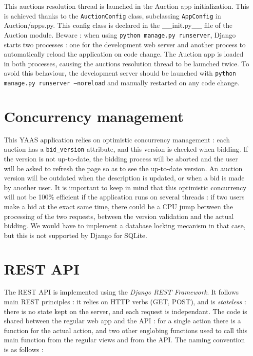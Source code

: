 \documentclass[a4paper, 11pt]{report}
\begin{document}
    This auctions resolution thread is launched in the Auction app initialization. This is achieved thanks to the \texttt{AuctionConfig} class, subclassing \texttt{AppConfig} in Auction/apps.py. This config class is declared in the \_\_init.py\_\_ file of the Auction module. Beware : when using \texttt{python manage.py runserver}, Django starts two processes : one for the development web server and another process to automatically reload the application on code change. The Auction app is loaded in both processes, causing the auctions resolution thread to be launched twice. To avoid this behaviour, the development server should be launched with \texttt{python manage.py runserver --noreload} and manually restarted on any code change. 

    \section{Concurrency management}

    This YAAS application relies on optimistic concurrency management : each auction has a \texttt{bid\_version} attribute, and this version is checked when bidding. If the version is not up-to-date, the bidding process will be aborted and the user will be asked to refresh the page so as to see the up-to-date version. An auction version will be outdated when the description is updated, or when a bid is made by another user. It is important to keep in mind that this optimistic concurrency will not be 100\% efficient if the application runs on several threads : if two users make a bid at the exact same time, there could be a CPU jump between the processing of the two requests, between the version validation and the actual bidding. We would have to implement a database locking mecanism in that case, but this is not supported by Django for SQLite. 

    \section{REST API}

    The REST API is implemented using the \textit{Django REST Framework}. It follows main REST principles : it relies on HTTP verbs (GET, POST), and is \textit{stateless} : there is no state kept on the server, and each request is independant. The code is shared between the regular web app and the API : for a single action there is a function for the actual action, and two other englobing functions used to call this main function from the regular views and from the API. The naming convention is as follows :
\end{document}
